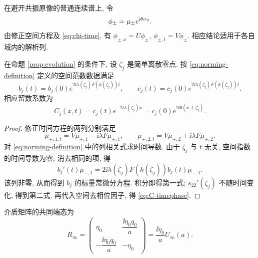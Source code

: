 \begin{remark}
在避开共振原像的普通连续谱上, 令
\begin{equation}\label{eq:full-jost}
\phi_\pm=\mu_\pm e^{\mathrm{i}\theta\sigma_3}.
\end{equation}
由修正空间方程及 \eqref{eq:chi-time}, 有 $\phi_{\pm,x}=U\phi_\pm$, $\phi_{\pm,t}=V\phi_\pm$.
相应结论适用于各自域内的解析列.
\end{remark}

\begin{proposition}\label{prop:norming-evolution}
在命题 \ref{prop:evolution} 的条件下, 设 $\zeta_j$ 是简单离散零点.
按 \eqref{eq:norming-definition} 定义的空间范数数据满足
\begin{equation}\label{eq:norming-time}
b_j(t)=b_j(0)e^{2\ii\lambda(\zeta_j)F(k(\zeta_j))t},\qquad
c_j(t)=c_j(0)e^{2\ii\lambda(\zeta_j)F(k(\zeta_j))t}.
\end{equation}
相应留数系数为
\begin{equation}\label{eq:C-timephase}
C_j(x,t)=c_j(t)e^{-2\ii\lambda(\zeta_j)x}
=c_j(0)e^{2\ii\theta(x,t,\zeta_j)}.
\end{equation}
\end{proposition}
\begin{proof}
修正时间方程的两列分别满足
\begin{equation*}
\mu_{\pm,1,t}=V\mu_{\pm,1}-\ii\lambda F\mu_{\pm,1},\qquad
\mu_{\pm,2,t}=V\mu_{\pm,2}+\ii\lambda F\mu_{\pm,2}.
\end{equation*}
对 \eqref{eq:norming-definition} 中的列相关式求时间导数.
由于 $\zeta_j$ 与 $t$ 无关, 空间指数的时间导数为零; 消去相同的项, 得
\begin{equation*}
b_j'(t)\mu_{-,1}
=2\ii\lambda(\zeta_j)F(k(\zeta_j))b_j(t)\mu_{-,1}.
\end{equation*}
该列非零, 从而得到 $b_j$ 的标量常微分方程.
积分即得第一式; $s_{22}'(\zeta_j)$ 不随时间变化, 得到第二式.
再代入空间去相位因子, 得 \eqref{eq:C-timephase}.
\end{proof}

介质矩阵的共同端态为
\begin{equation}\label{eq:Rbg}
R_\infty=\begin{pmatrix}
\eta_0&\dfrac{\ii\eta_0q_0}{a}\\[6pt]
-\dfrac{\ii\eta_0q_0}{a}&-\eta_0
\end{pmatrix}
=\dfrac{\ii\eta_0}{a}U_\infty(a).
\end{equation}

